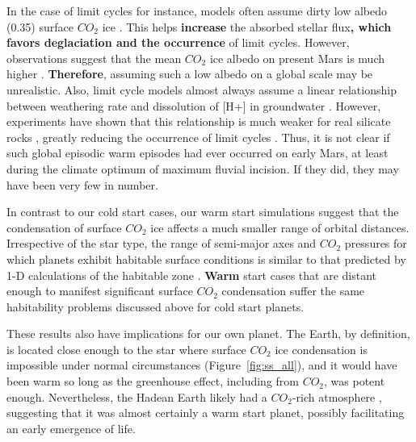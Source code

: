 \documentclass[fleqn,usenatbib]{mnras}
\providecommand{\DIFadd}[1]{{\bf #1}} %
\providecommand{\DIFdel}[1]{} %
\providecommand{\DIFaddbegin}{} %
\providecommand{\DIFaddend}{} %
\providecommand{\DIFdelbegin}{} %
\providecommand{\DIFdelend}{} %
\newcommand{\DIFscaledelfig}{0.5}
\newlength{\DIFdelgraphicswidth} %
\newlength{\DIFdelgraphicsheight} %
\newcommand{\DIFaddincludegraphics}[2][]{{\color{blue}\fbox{\DIFOincludegraphics[#1]{#2}}}} %
\newcommand{\DIFdelincludegraphics}[2][]{%
\sbox{\DIFdelgraphicsbox}{\DIFOincludegraphics[#1]{#2}}%
\settoboxwidth{\DIFdelgraphicswidth}{\DIFdelgraphicsbox} %
\settoboxtotalheight{\DIFdelgraphicsheight}{\DIFdelgraphicsbox} %
\scalebox{\DIFscaledelfig}{%
\parbox[b]{\DIFdelgraphicswidth}{\usebox{\DIFdelgraphicsbox}\\[-\baselineskip] \rule{\DIFdelgraphicswidth}{0em}}\llap{\resizebox{\DIFdelgraphicswidth}{\DIFdelgraphicsheight}{%
\setlength{\unitlength}{\DIFdelgraphicswidth}%
\begin{picture}(1,1)%
\thicklines\linethickness{2pt} %
{\color[rgb]{1,0,0}\put(0,0){\framebox(1,1){}}}%
{\color[rgb]{1,0,0}\put(0,0){\line( 1,1){1}}}%
{\color[rgb]{1,0,0}\put(0,1){\line(1,-1){1}}}%
\end{picture}%
}\hspace*{3pt}}} %
} %
\DeclareRobustCommand{\DIFaddbegin}{\DIFOaddbegin \let\includegraphics\DIFaddincludegraphics} %
\DeclareRobustCommand{\DIFaddend}{\DIFOaddend \let\includegraphics\DIFOincludegraphics} %
\DeclareRobustCommand{\DIFdelbegin}{\DIFOdelbegin \let\includegraphics\DIFdelincludegraphics} %
\DeclareRobustCommand{\DIFdelend}{\DIFOaddend \let\includegraphics\DIFOincludegraphics} %
\begin{document}
In the case of limit cycles for instance\DIFdelbegin \DIFdel{(see Methods)}\DIFdelend , models often assume dirty low albedo (0.35) surface $CO_{\mathrm{2}}$ ice \citep{batalha2016, kadoya_outer_2019,hayworth_warming_2020}. This helps \DIFdelbegin \DIFdel{reduce }\DIFdelend \DIFaddbegin \DIFadd{increase }\DIFaddend the absorbed stellar flux\DIFdelbegin \DIFdel{and increases the likelihood }\DIFdelend \DIFaddbegin \DIFadd{, which favors deglaciation and the occurrence }\DIFaddend of limit cycles. However, observations suggest that the mean $CO_{\mathrm{2}}$ ice albedo on present Mars is much higher \citep{forget2013}. \DIFdelbegin \DIFdel{So}\DIFdelend \DIFaddbegin \DIFadd{Therefore}\DIFaddend , assuming such a low albedo on a global scale may be unrealistic. Also, limit cycle models almost always assume a linear relationship between weathering rate and dissolution of \DIFaddbegin [\DIFaddend H+\DIFaddbegin ] \DIFaddend in groundwater \citep{batalha2016,kadoya_outer_2019,hayworth_warming_2020}. However, experiments have shown that this relationship is much weaker for real silicate rocks \citep{asolekar1991}, greatly reducing the occurrence of limit cycles \citep{ramirez2017mars}. Thus, it is not clear if such global episodic warm episodes had ever occurred on early Mars, at least during the climate optimum of maximum fluvial incision. If they did, they may have been very few in number.  

In contrast to our cold start cases, our warm start simulations suggest that the condensation of surface $CO_{\mathrm{2}}$ ice affects a much smaller range of orbital distances. Irrespective of the star type, the range of semi-major axes and $CO_{\mathrm{2}}$ pressures for which planets exhibit habitable surface conditions is similar to that predicted by 1-D calculations of the habitable zone \citep{kasting1993, Ramirez2018}. \DIFdelbegin \DIFdel{That said, warm }\DIFdelend \DIFaddbegin \DIFadd{Warm }\DIFaddend start cases that are distant enough to manifest significant surface $CO_{\mathrm{2}}$ condensation suffer the same habitability problems discussed above for cold start planets. \DIFdelbegin %

\DIFdelend These results also have implications for our own planet. The Earth, by definition, is located close enough to the star where surface $CO_{\mathrm{2}}$ ice condensation is impossible under normal circumstances (Figure~\ref{fig:ss_all}), and it would have been warm so long as the greenhouse effect, including from $CO_{\mathrm{2}}$, was potent enough. Nevertheless, the Hadean Earth likely had a $CO_{\mathrm{2}}$-rich atmosphere \citep{kasting2014}, suggesting that it was almost certainly a warm start planet, possibly facilitating an early emergence of life.
\end{document}
